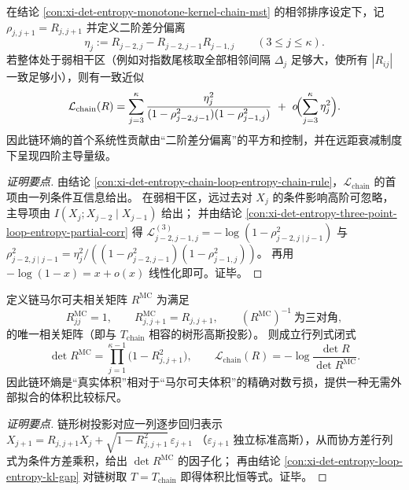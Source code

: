 \begin{conclusion}[弱相干链的 \(q=4\) 体积律：环熵主导项为二阶差分偏离的平方和]\label{con:xi-det-entropy-weak-coherence-chain-q4-law}
在结论 \ref{con:xi-det-entropy-monotone-kernel-chain-mst} 的相邻排序设定下，记 \(\rho_{j,j+1}=R_{j,j+1}\) 并定义二阶差分偏离
\[
\eta_j:=R_{j-2,j}-R_{j-2,j-1}R_{j-1,j}\qquad(3\le j\le\kappa).
\]
若整体处于弱相干区（例如对指数尾核取全部相邻间隔 \(\Delta_j\) 足够大，使所有 \(|R_{ij}|\) 一致足够小），则有一致近似
\[
\mathcal L_{\mathrm{chain}}(R)
=\sum_{j=3}^{\kappa}\frac{\eta_j^2}{(1-\rho_{j-2,j-1}^2)(1-\rho_{j-1,j}^2)}
\ +\ o\!\Bigl(\sum_{j=3}^{\kappa}\eta_j^2\Bigr).
\]
因此链环熵的首个系统性贡献由“二阶差分偏离”的平方和控制，并在远距衰减制度下呈现四阶主导量级。
\end{conclusion}
\begin{proof}[证明要点]
由结论 \ref{con:xi-det-entropy-chain-loop-entropy-chain-rule}，\(\mathcal L_{\mathrm{chain}}\) 的首项由一列条件互信息给出。
在弱相干区，远过去对 \(X_j\) 的条件影响高阶可忽略，主导项由 \(I(X_j;X_{j-2}\mid X_{j-1})\) 给出；
并由结论 \ref{con:xi-det-entropy-three-point-loop-entropy-partial-corr} 得
\(
\mathcal L^{(3)}_{j-2,j-1,j}=-\log(1-\rho_{j-2,j\mid j-1}^2)
\)
与
\(
\rho_{j-2,j\mid j-1}^2=\eta_j^2/((1-\rho_{j-2,j-1}^2)(1-\rho_{j-1,j}^2))
\)。
再用 \(-\log(1-x)=x+o(x)\) 线性化即可。证毕。
\end{proof}

\begin{conclusion}\label{con:xi-det-entropy-markov-volume-ratio}
定义链马尔可夫相关矩阵 \(R^{\mathrm{MC}}\) 为满足
\[
R^{\mathrm{MC}}_{jj}=1,\qquad
R^{\mathrm{MC}}_{j,j+1}=R_{j,j+1},
\qquad
(R^{\mathrm{MC}})^{-1}\ \text{为三对角},
\]
的唯一相关矩阵（即与 \(T_{\mathrm{chain}}\) 相容的树形高斯投影）。
则成立行列式闭式
\[
\det R^{\mathrm{MC}}=\prod_{j=1}^{\kappa-1}\bigl(1-R_{j,j+1}^2\bigr),
\qquad
\mathcal L_{\mathrm{chain}}(R)= -\log\frac{\det R}{\det R^{\mathrm{MC}}}.
\]
因此链环熵是“真实体积”相对于“马尔可夫体积”的精确对数亏损，提供一种无需外部拟合的体积比较标尺。
\end{conclusion}
\begin{proof}[证明要点]
链形树投影对应一列逐步回归表示
\(
X_{j+1}=R_{j,j+1}X_j+\sqrt{1-R_{j,j+1}^2}\,\varepsilon_{j+1}
\)
（\(\varepsilon_{j+1}\) 独立标准高斯），从而协方差行列式为条件方差乘积，给出 \(\det R^{\mathrm{MC}}\) 的因子化；
再由结论 \ref{con:xi-det-entropy-loop-entropy-kl-gap} 对链树取 \(T=T_{\mathrm{chain}}\) 即得体积比恒等式。证毕。
\end{proof}

